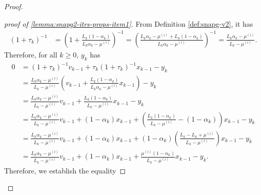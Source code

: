 \documentclass[12pt]{article}
\begin{document}
        \begin{proof}
            \begin{proof}[proof of \ref{lemma:snapg2-itrs-props-item1}]
                From Definition \ref{def:snapg-v2}, it has
                \begin{align*}
                    (1 + \tau_k)^{-1}
                    &=
                    \left(
                        1 + \frac{L_k(1 - \alpha_k)}{L_k\alpha_k - \mu^{(i)}}
                    \right)^{-1} = \left(
                        \frac{L_k\alpha_k - \mu^{(i)} + L_k(1 - \alpha_k)}{L_k\alpha_k - \mu^{(i)}}
                    \right)^{-1}
                    = \frac{L_k\alpha_k - \mu^{(i)}}{L_k - \mu^{(i)}}. 
                \end{align*}
                Therefore, for all $k \ge 0$, $y_k$ has 
                \begin{align*}
                    0 &= (1 + \tau_k)^{-1} v_{k - 1} + \tau_k (1 + \tau_k)^{-1} x_{k - 1} - y_k
                    \\
                    &= \frac{L_k\alpha_k - \mu^{(i)}}{L_k - \mu^{(i)}} 
                    \left(
                        v_{k - 1} + \frac{L_k(1 - \alpha_k)}{L_k\alpha_k - \mu^{(i)}} x_{k - 1}
                    \right) - y_k
                    \\
                    &= \frac{L_k\alpha_k - \mu^{(i)}}{L_k - \mu^{(i)}} v_{k - 1}
                    + \frac{L_k(1 - \alpha_k)}{L_k - \mu^{(i)}} x_{k - 1} - y_k
                    \\
                    &= \frac{L_k\alpha_k - \mu^{(i)}}{L_k - \mu^{(i)}} v_{k - 1} + (1 - \alpha_k)x_{k - 1}
                    + 
                    \left(
                        \frac{L_k(1 - \alpha_k)}{L_k - \mu^{(i)}} - (1 - \alpha_k)
                    \right) x_{k - 1} - y_k
                    \\
                    &= \frac{L_k\alpha_k - \mu^{(i)}}{L_k - \mu^{(i)}} v_{k - 1} + (1 - \alpha_k)x_{k - 1}
                    + 
                    (1 - \alpha_k)\left(
                        \frac{L_k - L_k + \mu^{(i)}}{L_k - \mu^{(i)}}
                    \right) x_{k - 1} - y_k
                    \\
                    &= \frac{L_k\alpha_k - \mu^{(i)}}{L_k - \mu^{(i)}} v_{k - 1} + (1 - \alpha_k)x_{k - 1}
                    + 
                    \frac{\mu^{(i)}(1 - \alpha_k)}{L_k - \mu^{(i)}}x_{k - 1} - y_k. 
                \end{align*}
                Therefore, we establish the equality 

\end{proof}
\end{proof}
\end{document}
